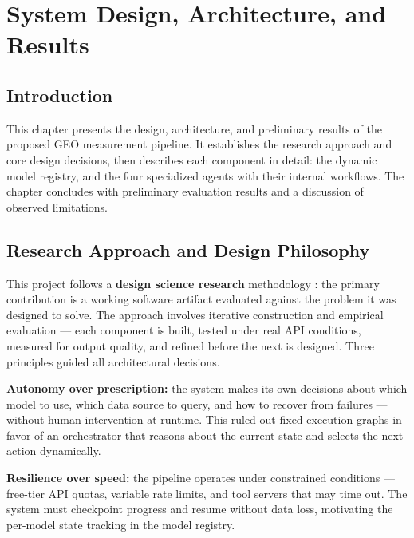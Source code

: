 \chapter{System Design, Architecture, and Results}
\label{chap:design}
\renewcommand{\chaptername}{Chapter}

\section*{Introduction}

This chapter presents the design, architecture, and preliminary results of the
proposed GEO measurement pipeline. It establishes the research approach and core
design decisions, then describes each component in detail: the dynamic model
registry, and the four specialized agents with their internal workflows. The chapter
concludes with preliminary evaluation results and a discussion of observed
limitations.

\section{Research Approach and Design Philosophy}

This project follows a \textbf{design science research} methodology
\cite{hevner2004design}: the primary contribution is a working software artifact
evaluated against the problem it was designed to solve. The approach involves
iterative construction and empirical evaluation --- each component is built, tested
under real API conditions, measured for output quality, and refined before the next
is designed. Three principles guided all architectural decisions.

\textbf{Autonomy over prescription:} the system makes its own decisions about which
model to use, which data source to query, and how to recover from failures ---
without human intervention at runtime. This ruled out fixed execution graphs in
favor of an orchestrator that reasons about the current state and selects the next
action dynamically.

\textbf{Resilience over speed:} the pipeline operates under constrained conditions
--- free-tier API quotas, variable rate limits, and tool servers that may time out.
The system must checkpoint progress and resume without data loss, motivating the
per-model state tracking in the model registry.

